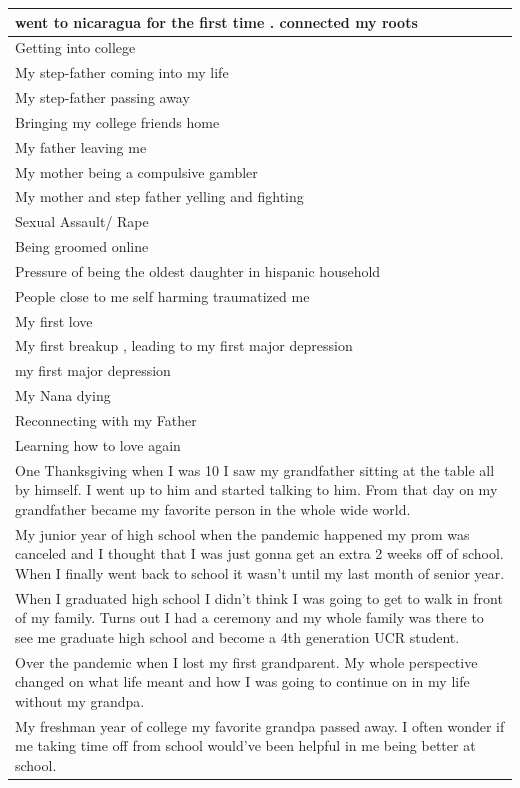 \documentclass[
  .7em,
  letterpaper,
  DIV=11,
  numbers=noendperiod]{scrartcl}
\begin{document}
\begin{table}
\begin{tabular}{l}
\hline
went to nicaragua for the first time . connected my roots\\
\hline
Getting into college\\
\hline
My step-father coming into my life\\
\hline
My step-father passing away\\
\hline
Bringing my college friends home\\
\hline
My father leaving me\\
\hline
My mother being a compulsive gambler\\
\hline
My mother and step father yelling and fighting\\
\hline
Sexual Assault/ Rape\\
\hline
Being groomed online\\
\hline
Pressure of being the oldest daughter in hispanic household\\
\hline
People close to me self harming traumatized me\\
\hline
My first love\\
\hline
My first breakup , leading to my first major depression\\
\hline
my first major depression\\
\hline
My Nana dying\\
\hline
Reconnecting with my Father\\
\hline
Learning how to love again\\
\hline
One Thanksgiving when I was 10 I saw my grandfather sitting at the table all by himself. I went up to him and started talking to him. From that day on my grandfather became my favorite person in the whole wide world.\\
\hline
My junior year of high school when the pandemic happened my prom was canceled and I thought that I was just gonna get an extra 2 weeks off of school. When I finally went back to school it wasn't until my last month of senior year.\\
\hline
When I graduated high school I didn't think I was going to get to walk in front of my family. Turns out I had a ceremony and my whole family was there to see me graduate high school and become a 4th generation UCR student.\\
\hline
Over the pandemic when I lost my first grandparent. My whole perspective changed on what life meant and how I was going to continue on in my life without my grandpa.\\
\hline
My freshman year of college my favorite grandpa passed away. I often wonder if me taking time off from school would've been helpful in me being better at school.\\

\end{tabular}
\end{table}
\end{document}
